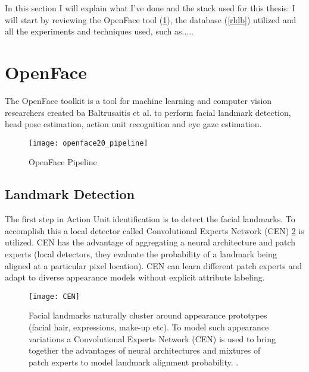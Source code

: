 In this section I will explain what I've done and the stack used for this thesis: I will start by reviewing the OpenFace tool (\ref{OpenFace}), the database (\ref{rldb}) utilized and all the experiments and techniques used, such as.....



\section{OpenFace} \label{OpenFace}
The OpenFace \cite{Baltru2018} toolkit is a tool for machine learning and computer vision researchers created ba Baltrusaitis et al. to perform facial landmark detection, head pose estimation, action unit recognition and eye gaze estimation. \\

\begin{figure}[H]
	\centering
	\texttt{[image: openface20\_pipeline]}
	\caption{OpenFace Pipeline \cite{Baltru2018}}
	\label{fig:openface20_pipeline}
\end{figure}

\subsection{Landmark Detection}
The first step in Action Unit identification is to detect the facial landmarks. To accomplish this a local detector called Convolutional Experts Network (CEN) \ref{fig:CEN} is utilized. CEN has the advantage of aggregating a neural architecture and patch experts (local detectors, they evaluate the probability of a landmark being aligned at a particular pixel location). CEN can learn different patch experts and adapt to diverse appearance models without explicit attribute labeling. \\

\begin{figure}[H]
	\centering
	\texttt{[image: CEN]}
	\caption{Facial landmarks naturally cluster around appearance prototypes (facial hair, expressions, make-up etc). To model such appearance variations a Convolutional Experts Network (CEN) is used to bring together the advantages of neural architectures and mixtures of patch experts to model landmark alignment probability. \cite{Baltru2017}.}
	\label{fig:CEN}
\end{figure}

